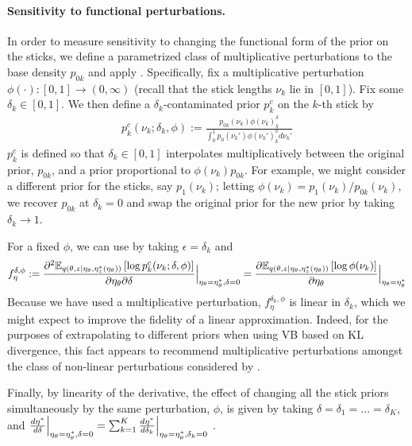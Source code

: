 

\paragraph{Sensitivity to functional perturbations.}
%
In order to measure sensitivity to changing the functional form of the prior on
the sticks, we define a parametrized class of multiplicative perturbations to
the base density $p_{0k}$ and apply .
Specifically, fix a multiplicative perturbation $\phi(\cdot): [0, 1] \rightarrow
(0, \infty)$ (recall that the stick lengths $\nu_k$  lie in $[0, 1]$). Fix some
$\delta_k\in[0, 1]$.  We then define a $\delta_k$-contaminated prior $p^c_{k}$ on
the $k$-th stick by
%
\begin{align}
\label{eq:expon_perturb}
	p^c_{k}(\nu_k ; \delta_k, \phi) :=
  \frac{p_{0k}(\nu_k)\phi(\nu_k)^\delta_k}
       {\int_0^1 p_0(\nu_k')\phi(\nu_k')^\delta_k d\nu_k'}
\end{align}
%
$p^c_{k}$ is defined so that $\delta_k\in[0, 1]$ interpolates multiplicatively
between the original prior, $p_{0k}$, and a prior proportional to
$\phi(\nu_k)p_{0k}$. For example, we might consider a different prior for the
sticks, say $p_1(\nu_k)$; letting $\phi(\nu_k) = p_1(\nu_k) / p_{0k}(\nu_k)$, we
recover $p_{0k}$ at $\delta_k = 0$ and swap the original prior for the new prior
by taking $\delta_k \rightarrow 1$.

For a fixed $\phi$, we can use  by taking
$\epsilon = \delta_k$ and
%
\begin{align*}
f^{\delta,\phi}_\eta :=
\frac{\partial^2
    \mathbb{E}_{q\left(\theta, z \vert \eta_\theta, \eta_z^{*}(\eta_\theta)\right)} \left[ \log p^c_{k}(\nu_k ; \delta, \phi) \right]}
{\partial \eta_\theta \partial \delta}
    \Big\rvert_{\eta_\theta = \eta_\theta^{*}, \delta = 0} =
\frac{\partial
    \mathbb{E}_{q\left(\theta, z \vert \eta_\theta, \eta_z^{*}(\eta_\theta)\right)} \left[ \log\phi(\nu_k) \right]}
{\partial \eta_\theta}
    \Big\rvert_{\eta_\theta = \eta_\theta^{*}}
\end{align*}
%
Because we have used a multiplicative perturbation, $f^{\delta_k, \phi}_\eta$
is linear in $\delta_k$, which we might expect to improve the fidelity of a
linear approximation.
%
Indeed, for the purposes of extrapolating to different priors
when using VB based on KL divergence, this
fact appears to recommend multiplicative perturbations amongst the class of
non-linear perturbations considered by \citet{gustafson:1996:localposterior}.

Finally, by linearity of the derivative, the effect of changing all the stick
priors simultaneously by the same perturbation, $\phi$, is given by taking
$\delta = \delta_1 = ... = \delta_K$, and
$\frac{d\eta^{*}}{d\delta} \Big\rvert_{\eta_\theta = \eta_\theta^{*}, \delta=0} =
    \sum_{k=1}^{K} \frac{d\eta^{*}}{d\delta_k}
    \Big\rvert_{\eta_\theta = \eta_\theta^{*}, \delta_k=0}$
\citep{gustafson:1996:localmarginals}.
